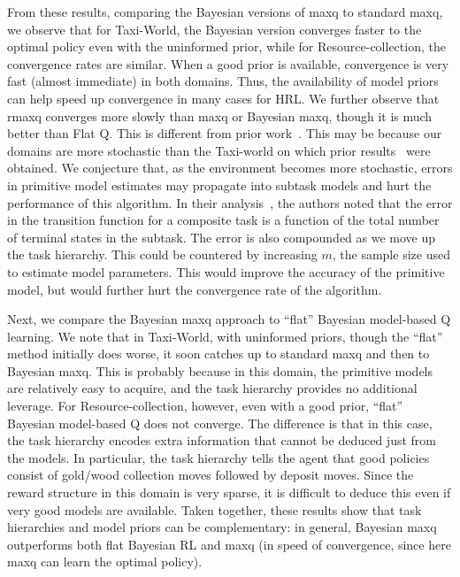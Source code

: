 From these results, comparing the Bayesian versions of {\sc maxq} to
standard {\sc maxq}, we observe that for {\sf Taxi-World}, the
Bayesian version converges faster to the optimal policy even with the
uninformed prior, while for {\sf Resource-collection}, the convergence
rates are similar. When a good prior is available, convergence is very
fast (almost immediate) in both domains. Thus, the availability of
model priors can help speed up convergence in many cases for HRL. We
further observe that {\sc rmaxq} converges more
slowly than {\sc maxq} or Bayesian {\sc maxq}, though it is much
better than Flat Q. This is different from prior
work~\cite{rmax-maxq}. This may be because our domains are more
stochastic than the {\sf Taxi-world} on which prior
results~\cite{rmax-maxq} were obtained. We conjecture that, 
as the environment becomes more stochastic, errors in primitive
model estimates may propagate into subtask models and hurt the
performance of this algorithm. In their analysis~\cite{rmax-maxq}, the authors noted that the error in the
transition function for a composite task is a function of the total number of terminal states in the subtask. The error is also
compounded as we move up the task hierarchy. This could be countered
by  increasing $m$, the sample size used to estimate model parameters. This
 would improve the accuracy of the primitive model, but 
 would further hurt the convergence rate of the algorithm.

Next, we compare the Bayesian {\sc maxq} approach to ``flat'' Bayesian
model-based Q learning. We note that in {\sf Taxi-World}, with uninformed
priors, though the ``flat'' method initially does worse, it soon
catches up to standard {\sc maxq} and then to Bayesian {\sc maxq}. This is
probably because in this domain, the primitive models are relatively
easy to acquire, and the task hierarchy provides no additional
leverage. For {\sf Resource-collection}, however, 
even with a good prior, ``flat'' Bayesian model-based Q does not
converge. The difference is that in this case, the task hierarchy
encodes extra information that cannot be deduced just from the models.
In particular, the task hierarchy tells the agent that good policies
consist of gold/wood collection moves followed by deposit moves. Since
the reward structure in this domain is very sparse, it is difficult to
deduce this even if very good models are available. Taken together,
these results show that task hierarchies and model priors can be
complementary: in general, Bayesian {\sc maxq} outperforms both flat
Bayesian RL and {\sc maxq} (in speed of convergence, since here {\sc maxq} can
learn the optimal policy).

